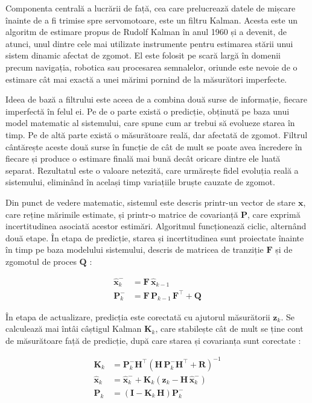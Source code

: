 Componenta centrală a lucrării de față, cea care prelucrează datele de mișcare
înainte de a fi trimise spre servomotoare, este un filtru Kalman. Acesta este un
algoritm de estimare propus de Rudolf Kalman în anul 1960 \cite{kalman1960} și a
devenit, de atunci, unul dintre cele mai utilizate instrumente pentru estimarea
stării unui sistem dinamic afectat de zgomot. El este folosit pe scară largă în
domenii precum navigația, robotica sau procesarea semnalelor, oriunde este nevoie
de o estimare cât mai exactă a unei mărimi pornind de la măsurători imperfecte.

Ideea de bază a filtrului este aceea de a combina două surse de informație, fiecare
imperfectă în felul ei. Pe de o parte există o predicție, obținută pe baza unui
model matematic al sistemului, care spune cum ar trebui să evolueze starea în timp.
Pe de altă parte există o măsurătoare reală, dar afectată de zgomot. Filtrul
cântărește aceste două surse în funcție de cât de mult se poate avea încredere în
fiecare și produce o estimare finală mai bună decât oricare dintre ele luată
separat. Rezultatul este o valoare netezită, care urmărește fidel evoluția reală a
sistemului, eliminând în același timp variațiile bruște cauzate de zgomot.

Din punct de vedere matematic, sistemul este descris printr-un vector de stare
$\mathbf{x}$, care reține mărimile estimate, și printr-o matrice de covarianță
$\mathbf{P}$, care exprimă incertitudinea asociată acestor estimări. Algoritmul
funcționează ciclic, alternând două etape. În etapa de predicție, starea și
incertitudinea sunt proiectate înainte în timp pe baza modelului sistemului,
descris de matricea de tranziție $\mathbf{F}$ și de zgomotul de proces
$\mathbf{Q}$ \cite{welch1995}:

\begin{align}
	\hat{\mathbf{x}}_{k}^{-} &= \mathbf{F}\,\hat{\mathbf{x}}_{k-1} \\
	\mathbf{P}_{k}^{-} &= \mathbf{F}\,\mathbf{P}_{k-1}\,\mathbf{F}^{\top} + \mathbf{Q}
\end{align}

În etapa de actualizare, predicția este corectată cu ajutorul măsurătorii
$\mathbf{z}_k$. Se calculează mai întâi câștigul Kalman $\mathbf{K}_k$, care
stabilește cât de mult se ține cont de măsurătoare față de predicție, după care
starea și covarianța sunt corectate \cite{welch1995}:

\begin{align}
	\mathbf{K}_k &= \mathbf{P}_{k}^{-}\mathbf{H}^{\top}
	\left(\mathbf{H}\,\mathbf{P}_{k}^{-}\mathbf{H}^{\top} + \mathbf{R}\right)^{-1} \\
	\hat{\mathbf{x}}_{k} &= \hat{\mathbf{x}}_{k}^{-}
	+ \mathbf{K}_k\left(\mathbf{z}_k - \mathbf{H}\,\hat{\mathbf{x}}_{k}^{-}\right) \\
	\mathbf{P}_{k} &= \left(\mathbf{I} - \mathbf{K}_k\,\mathbf{H}\right)\mathbf{P}_{k}^{-}
\end{align}


